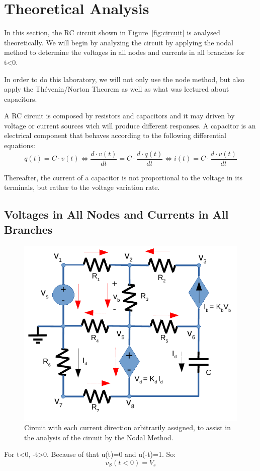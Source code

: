 \section{Theoretical Analysis}
\label{sec:analysis}
In this section, the RC circuit shown in Figure~\ref{fig:circuit} is analysed
theoretically. We will begin by analyzing the circuit by applying the nodal method to determine the voltages in all nodes and currents in all branches for t\textless 0.

In order to do this laboratory, we will not only use the node method, but also apply the Thévenin/Norton Theorem as well as what was lectured about capacitors.

A RC circuit is composed by resistors and capacitors and it may driven by voltage or current sources wich will produce different responses.
A capacitor is an electrical component that behaves according to the following differential equations:
\begin{equation}
  q(t)=C\cdot v(t)\Leftrightarrow \frac{d\cdot v(t)}{dt} = C\cdot \frac{d\cdot q(t)}{dt}\Leftrightarrow i(t)=C\cdot \frac{d\cdot v(t)}{dt}
\end{equation}

Thereafter, the current of a capacitor is not proportional to the voltage in its terminals, but rather to the voltage variation rate.

\subsection{Voltages in All Nodes and Currents in All Branches}

\begin{figure}[H] \centering
\includegraphics[width=0.4\linewidth]{mcurrents.pdf}
\caption{Circuit with each current direction arbitrarily assigned, to assist in the analysis of the circuit by the Nodal Method.}
\label{fig:nvoltages}
\end{figure}

For t\textless 0, -t\textgreater 0. Because of that u(t)=0 and u(-t)=1. So:
\begin{equation}
  v_S(t<0)=V_s
\end{equation}

